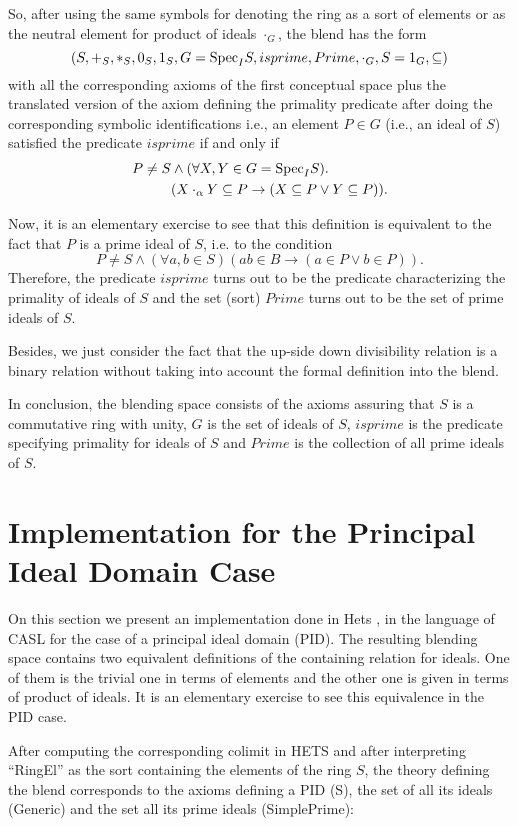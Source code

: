 So, after using the same symbols for denoting the ring as a sort of elements or as the neutral element for product of ideals $\cdot_G$, the blend has the form
\[(S, +_S, *_S, 0_S, 1_S, G={\rm Spec}_IS, isprime, Prime, \cdot_G,
S=1_G, \subseteq)\] with all the corresponding axioms of the first
conceptual space plus the translated version of the axiom defining the
primality predicate after doing the corresponding symbolic
identifications i.e., an element $P \in G$ (i.e., an ideal of $S$)
satisfied the predicate $isprime$ if and only if
\begin{align*}
P\neq S & \wedge (\forall X,Y\in G={\rm Spec}_IS). \\
        & (X\cdot_{\alpha}Y\subseteq P \rightarrow (X\subseteq P \vee Y\subseteq P)).
\end{align*}

Now, it is an elementary exercise to see that this definition is
equivalent to the fact that $P$ is a prime ideal of $S$, i.e. to the
condition
\[ P\neq S \wedge (\forall a,b\in S)(ab\in B\rightarrow (a\in P \vee
b\in P)).\] Therefore, the predicate $isprime$ turns out to be the
predicate characterizing the primality of ideals of $S$ and the set
(sort) $Prime$ turns out to be the set of prime ideals of $S$.

Besides, we just consider the fact that the up-side down divisibility
relation is a binary relation without taking into account the formal
definition into the blend.

In conclusion, the blending space consists of the axioms assuring that
$S$ is a commutative ring with unity, $G$ is the set of ideals of $S$,
$isprime$ is the predicate specifying primality for ideals of $S$ and
$Prime$ is the collection of all prime ideals of $S$.
 
\section{Implementation for the Principal Ideal Domain Case}

On this section we present an implementation done in
Hets \parencite{Mossakowskihets}, in the language of CASL for the case
of a principal ideal domain (PID).  The resulting blending space
contains two equivalent definitions of the containing relation for
ideals. One of them is the trivial one in terms of elements and the
other one is given in terms of product of ideals. It is an elementary
exercise to see this equivalence in the PID case.



After computing the corresponding colimit in HETS and after
interpreting ``RingEl'' as the sort containing the elements of the ring
$S$, the theory defining the blend corresponds to the axioms defining
a PID (S), the set of all its ideals (Generic) and the set all its
prime ideals (SimplePrime):





% 
% 


